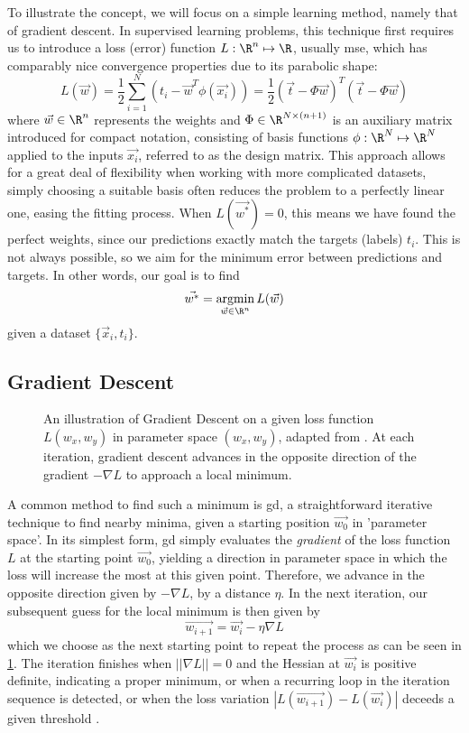 To illustrate the concept, we will focus on a simple learning method, namely that of gradient descent.
In supervised learning problems, this technique first requires us to introduce a loss (error) function $L: \R^n \mapsto \R$, usually \gls{mse}, which has comparably nice convergence properties due to its parabolic shape:
$$L(\vec{w}) = \frac{1}{2} \sum_{i=1}^N (t_i - \vec{w}^T \phi(\vec{x_i})) = \frac{1}{2} (\vec{t} - \Phi \vec{w})^T (\vec{t} - \Phi \vec{w})$$
where $\vec{w} \in \R^n$ represents the weights and $\Phi \in \R^{N \times (n+1)}$ is an auxiliary matrix introduced for compact notation, consisting of basis functions $\phi: \R^N \mapsto \R^N$ applied to the inputs $\vec{x_i}$, referred to as the design matrix.
This approach allows for a great deal of flexibility when working with more complicated datasets, simply choosing a suitable basis often reduces the problem to a perfectly linear one, easing the fitting process.
When $L(\vec{w^*}) = 0$, this means we have found the perfect weights, since our predictions exactly match the targets (labels) $t_i$.
This is not always possible, so we aim for the minimum error between predictions and targets.
In other words, our goal is to find
$$\vec{w^*} = \underset{\vec{w} \in \R^n}{\text{argmin}}\, L(\vec{w})$$
given a dataset $\{\vec{x}_i, t_i\}$.

\subsection{Gradient Descent}
\begin{figure}[H]
  \centering
  \caption[Illustration of Gradient Descent]{
    An illustration of Gradient Descent on a given loss function $L(w_x, w_y)$ in parameter space $(w_x, w_y)$, adapted from \cite{gradient-descent-plot}.
    At each iteration, gradient descent advances in the opposite direction of the gradient $-\nabla L$ to approach a local minimum.
  }
  \label{fig:gradient-descent}
\end{figure}

A common method to find such a minimum is \gls{gd}, a straightforward iterative technique to find nearby minima, given a starting position $\vec{w_0}$ in 'parameter space'.
In its simplest form, \gls{gd} simply evaluates the \textit{gradient} of the loss function $L$ at the starting point $\vec{w_0}$, yielding a direction in parameter space in which the loss will increase the most at this given point.
Therefore, we advance in the opposite direction given by $-\nabla L$, by a distance $\eta$.
In the next iteration, our subsequent guess for the local minimum is then given by $$\vec{w_{i+1}} = \vec{w_i} - \eta \nabla L$$
which we choose as the next starting point to repeat the process as can be seen in \cref{fig:gradient-descent}.
The iteration finishes when $||\nabla L|| = 0$ and the Hessian at $\vec{w_i}$ is positive definite, indicating a proper minimum, or when a recurring loop in the iteration sequence is detected, or when the loss variation $|L(\vec{w_{i+1}}) - L(\vec{w_i})|$ deceeds a given threshold \parencite{bishop-pattern-recognition-and-ml}.

